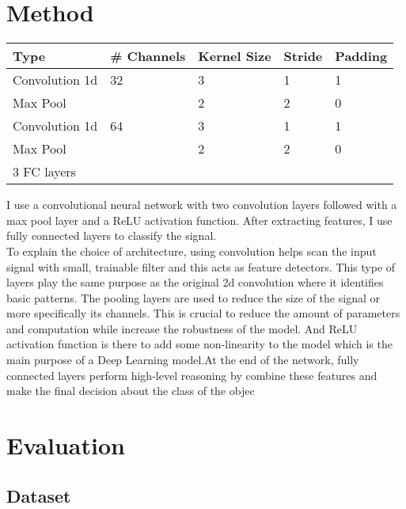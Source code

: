 \documentclass{article}
\begin{document}
\section{Method}

\begin{table}[h]
    \centering
    \begin{tabular}{|l|l|l|l|l|}
    \hline
    Type        & \# Channels & Kernel Size & Stride & Padding \\ \hline
    Convolution 1d & 32          & 3           & 1      & 1       \\ \hline
    Max Pool    &             & 2           & 2      & 0       \\ \hline
    Convolution 1d & 64          & 3           & 1      & 1       \\ \hline
    Max Pool    &             & 2           & 2      & 0       \\ \hline
    3 FC layers   &             &             &        &         \\ \hline
    \end{tabular}
    \end{table}

I use a convolutional neural network with two convolution layers followed with
a max pool layer and a ReLU activation function. After extracting features,
I use fully connected layers to classify the signal.\\

To explain the choice of architecture, using convolution helps scan the input
signal with small, trainable filter and this acts as feature detectors. This type
of layers play the same purpose as the original 2d convolution where it identifies
basic patterns. The pooling layers are used to reduce the size of the signal or more
specifically its channels. This is crucial to reduce the amount of parameters and
computation while increase the robustness of the model. And ReLU activation function
is there to add some non-linearity to the model which is the main purpose of a
Deep Learning model.At the end of the network, fully connected layers perform high-level
reasoning by combine these features and make the final decision about the class of the objec

\section{Evaluation}

\subsection{Dataset}
\end{document}
